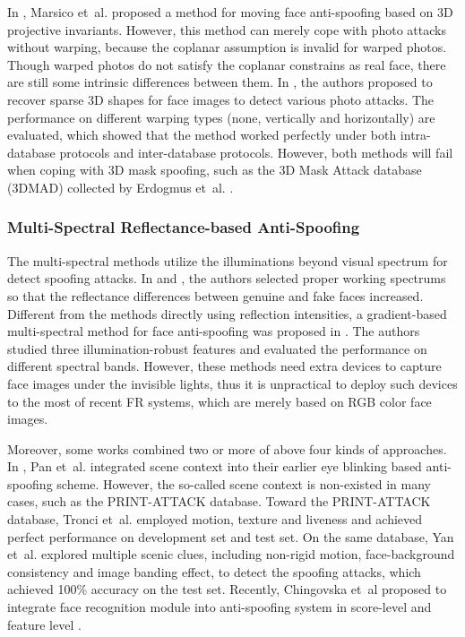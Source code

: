 \documentclass[letterpaper, 10 pt, conference]{ieeeconf}
\begin{document}
In \cite{de2012moving}, Marsico et~al. proposed a method for moving face anti-spoofing based on 3D projective invariants. However, this method can merely cope with photo attacks without warping, because the coplanar assumption is invalid for warped photos. Though warped photos do not satisfy the coplanar constrains as real face, there are still some intrinsic differences between them. In \cite{wang2013face}, the authors proposed to recover sparse 3D shapes for face images to detect various photo attacks. The performance on different warping types (none, vertically and horizontally) are evaluated, which showed that the method worked perfectly under both intra-database protocols and inter-database protocols. However, both methods will fail when coping with 3D mask spoofing, such as the 3D Mask Attack database (3DMAD) collected by Erdogmus et~al. \cite{erdogmus2013spoofing}.

\subsubsection{Multi-Spectral Reflectance-based Anti-Spoofing}

The multi-spectral methods utilize the illuminations beyond visual spectrum for detect spoofing attacks. In \cite{DBLP:conf/CVBVS/Pavlidis} and \cite{DBLP:conf/fgr/ZhangYLL11}, the authors selected proper working spectrums so that the reflectance differences between genuine and fake faces increased. Different from the methods directly using reflection intensities, a gradient-based multi-spectral method for face anti-spoofing was proposed in \cite{hou2013multispectral}. The authors studied three illumination-robust features and evaluated the performance on different spectral bands. However, these methods need extra devices to capture face images under the invisible lights, thus it is unpractical to deploy such devices to the most of recent FR systems, which are merely based on RGB color face images.

Moreover, some works combined two or more of above four kinds of approaches. In \cite{Face_Anti_Spoofing_Pan_Eyeblink_2007}, Pan et~al. integrated scene context into their earlier eye blinking based anti-spoofing scheme. However, the so-called scene context is non-existed in many cases, such as the PRINT-ATTACK database. Toward the PRINT-ATTACK database, Tronci et~al. employed motion, texture and liveness \cite{tronci2011fusion} and achieved perfect performance on development set and test set. On the same database, Yan et~al. \cite{yan2012face} explored multiple scenic clues, including non-rigid motion, face-background consistency and image banding effect, to detect the spoofing attacks, which achieved 100\% accuracy on the test set. Recently, Chingovska et~al proposed to integrate face recognition module into anti-spoofing system in score-level and feature level \cite{anjos2013anti}.
\end{document}
